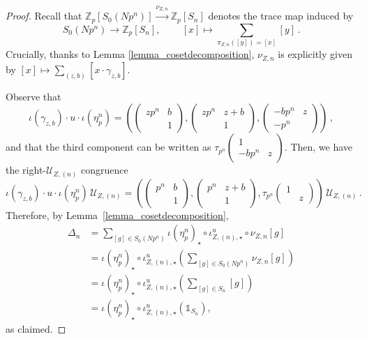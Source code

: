 \documentclass{amsart}
\numberwithin{equation}{section}
\newcommand{\bb}{\mathbb}
\newcommand{\Zp}{\mathbb{Z}_p}
\newcommand{\lra}{\longrightarrow}
\begin{document}
\begin{proof}

 Recall that $\Zp[S_0(Np^n)] \xrightarrow{\nu_{Z,n}} \Zp[S_n]$ denotes the trace map induced by $$ S_0(Np^n) \lra \bb{Z}_p[S_n],\, \qquad [x] \mapsto \sum_{\pi_{Z,n}([y])=[x]} [y]\,.$$ Crucially, thanks to  Lemma \ref{lemma_cosetdecomposition}, $\nu_{Z,n}$ is explicitly given by $[x] \mapsto \sum_{(z,b)} [x \cdot \gamma_{z,b}]$. 
 
 Observe that 
 $$\iota(\gamma_{z,b}) \cdot u \cdot \iota(\eta_p^n)=\left(  \left( \begin{smallmatrix} z p^n & b \\  & 1 \end{smallmatrix} \right), \left( \begin{smallmatrix} z p^n &  z+b \\  & 1 \end{smallmatrix} \right),\left( \begin{smallmatrix} -b p^n  &  z \\ -p^n &  \end{smallmatrix} \right)\right)\,,$$ 
 and that the third component can be written as $\tau_{p^n}\left( \begin{smallmatrix} 1 &  \\ -b p^n & z \end{smallmatrix} \right)$. Then, we have the right-$\mathcal{U}_{Z,(n)}$ congruence 
 $$\iota(\gamma_{z,b}) \cdot u \cdot \iota(\eta_p^n)\,\mathcal{U}_{Z,(n)}=\left(  \left( \begin{smallmatrix} p^n & b \\  & 1 \end{smallmatrix} \right), \left( \begin{smallmatrix} p^n &  z+b \\  & 1 \end{smallmatrix} \right),\tau_{p^n}\left( \begin{smallmatrix} 1 &  \\  & z \end{smallmatrix} \right)\right)\,\mathcal{U}_{Z,(n)}\,.$$ 
 Therefore, by Lemma~\ref{lemma_cosetdecomposition}, 
 \begin{align*}
    \Delta_{n}  &= \sum_{[g] \in S_0(Np^n)} \iota(\eta_p^n)_\star \circ \iota_{Z,(n),\star}^u \circ \nu_{Z,n}[g] \\ &= \iota(\eta_p^n)_\star \circ \iota_{Z,(n),\star}^u\left(\sum_{[g] \in S_0(Np^n)}  \nu_{Z,n}[g]\right) \\    
    &=\iota(\eta_p^n)_\star \circ \iota_{Z,(n),\star}^u\left(\sum_{[g] \in S_n}[g]\right) \\ 
    &=\iota(\eta_p^n)_\star \circ \iota_{Z,(n),\star}^u\left(\mathbb{1}_{S_n}\right), 
\end{align*}
as claimed.
\end{proof}
\end{document}
